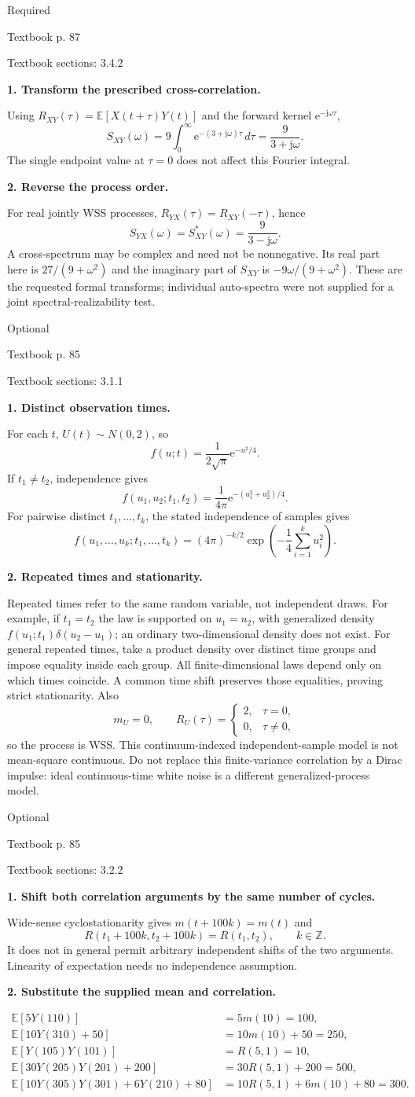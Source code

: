 \documentclass[11pt]{article}
\newcommand{\E}{\mathbb E}\newcommand{\Var}{\operatorname{Var}}\newcommand{\Cov}{\operatorname{Cov}}
\newcommand{\jj}{\mathrm j}\newcommand{\ee}{\mathrm e}
\newcommand{\problem}[3]{\par\addvspace{1em}\Needspace{8\baselineskip}{\LARGE\bfseries Exercise #1}\hfill #2\par{\small\color{gray}Textbook p. #3}\par\vspace{3mm}}
\newcommand{\step}[1]{\par\Needspace{6\baselineskip}\textbf{#1}\par}
\begin{document}
\problem{3.25}{Required}{87}
{\small Textbook sections: 3.4.2}
\step{1. Transform the prescribed cross-correlation.}
Using $R_{XY}(\tau)=\E[X(t+\tau)Y(t)]$ and the forward kernel $\ee^{-\jj\omega\tau}$,
\[S_{XY}(\omega)=9\int_0^\infty\ee^{-(3+\jj\omega)\tau}\,d\tau
=\boxed{\frac9{3+\jj\omega}}.\]
The single endpoint value at $\tau=0$ does not affect this Fourier integral.
\step{2. Reverse the process order.}
For real jointly WSS processes, $R_{YX}(\tau)=R_{XY}(-\tau)$, hence
\[\boxed{S_{YX}(\omega)=S_{XY}^*(\omega)=\frac9{3-\jj\omega}}.\]
A cross-spectrum may be complex and need not be nonnegative. Its real part here is $27/(9+\omega^2)$ and the imaginary part of $S_{XY}$ is $-9\omega/(9+\omega^2)$. These are the requested formal transforms; individual auto-spectra were not supplied for a joint spectral-realizability test.

\problem{3.1}{Optional}{85}
{\small Textbook sections: 3.1.1}
\step{1. Distinct observation times.}
For each $t$, $U(t)\sim N(0,2)$, so
\[\boxed{f(u;t)=\frac1{2\sqrt\pi}\ee^{-u^2/4}}.\]
If $t_1\ne t_2$, independence gives
\[\boxed{f(u_1,u_2;t_1,t_2)=\frac1{4\pi}\ee^{-(u_1^2+u_2^2)/4}}.\]
For pairwise distinct $t_1,\ldots,t_k$, the stated independence of samples gives
\[\boxed{f(u_1,\ldots,u_k;t_1,\ldots,t_k)=(4\pi)^{-k/2}\exp\left(-\frac14\sum_{i=1}^ku_i^2\right)}.\]
\step{2. Repeated times and stationarity.}
Repeated times refer to the same random variable, not independent draws. For example, if $t_1=t_2$ the law is supported on $u_1=u_2$, with generalized density $f(u_1;t_1)\delta(u_2-u_1)$; an ordinary two-dimensional density does not exist. For general repeated times, take a product density over distinct time groups and impose equality inside each group.
All finite-dimensional laws depend only on which times coincide. A common time shift preserves those equalities, proving strict stationarity. Also
\[m_U=0,\qquad R_U(\tau)=\begin{cases}2,&\tau=0,\\0,&\tau\ne0,\end{cases}\]
so the process is WSS. This continuum-indexed independent-sample model is not mean-square continuous. Do not replace this finite-variance correlation by a Dirac impulse: ideal continuous-time white noise is a different generalized-process model.

\problem{3.7}{Optional}{85}
{\small Textbook sections: 3.2.2}
\step{1. Shift both correlation arguments by the same number of cycles.}
Wide-sense cyclostationarity gives $m(t+100k)=m(t)$ and
\[R(t_1+100k,t_2+100k)=R(t_1,t_2),\qquad k\in\mathbb Z.\]
It does not in general permit arbitrary independent shifts of the two arguments. Linearity of expectation needs no independence assumption.
\step{2. Substitute the supplied mean and correlation.}
\[\begin{aligned}
\E[5Y(110)]&=5m(10)=\boxed{100},\\
\E[10Y(310)+50]&=10m(10)+50=\boxed{250},\\
\E[Y(105)Y(101)]&=R(5,1)=\boxed{10},\\
\E[30Y(205)Y(201)+200]&=30R(5,1)+200=\boxed{500},\\
\E[10Y(305)Y(301)+6Y(210)+80]&=10R(5,1)+6m(10)+80=\boxed{300}.
\end{aligned}\]
\end{document}
